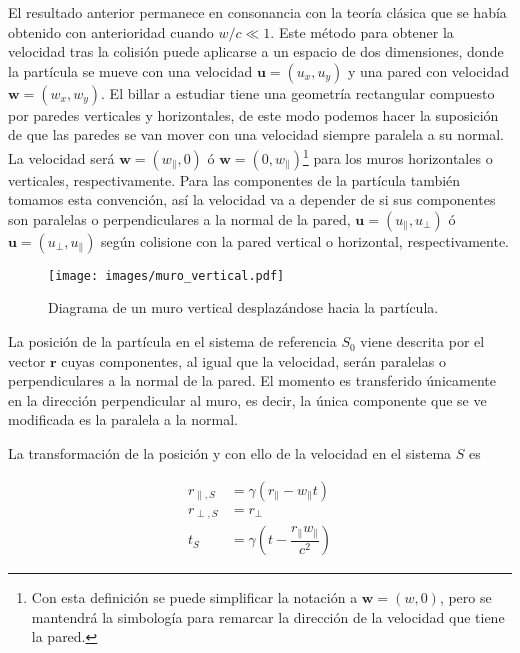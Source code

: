 El resultado anterior permanece en consonancia con la teoría clásica que se había obtenido con anterioridad cuando \( w/c \ll 1 \). Este método para obtener la velocidad tras la colisión puede aplicarse a un espacio de dos dimensiones, donde la partícula se mueve con una velocidad \( \mathbf{u} = (u_x, u_y) \) y una pared con velocidad \( \mathbf{w} = (w_x, w_y) \). El billar a estudiar tiene una geometría rectangular compuesto por paredes verticales y horizontales, de este modo podemos hacer la suposición de que las paredes se van mover con una velocidad siempre paralela a su normal. La velocidad será \( \mathbf{w} = (w_\parallel, 0) \) ó \( \mathbf{w} = (0, w_\parallel) \)\footnote{Con esta definición se puede simplificar la notación a \( \mathbf{w} = (w, 0) \), pero se mantendrá la simbología para remarcar la dirección de la velocidad que tiene la pared.} para los muros horizontales o verticales, respectivamente. Para las componentes de la partícula también tomamos esta convención, así la velocidad va a depender de si sus componentes son paralelas o perpendiculares a la normal de la pared, \( \mathbf{u} = (u_\parallel, u_\perp) \) ó \( \mathbf{u} = (u_\perp, u_\parallel) \) según colisione con la pared vertical o horizontal, respectivamente.

\begin{figure}[H]
    \centering
    \texttt{[image: images/muro\_vertical.pdf]}
    \caption{Diagrama de un muro vertical desplazándose hacia la partícula.}
    \label{fig:muro_vertical}
\end{figure}

La posición de la partícula en el sistema de referencia \( S_0 \) viene descrita por el vector \( \mathbf{r} \) cuyas componentes, al igual que la velocidad, serán paralelas o perpendiculares a la normal de la pared. El momento es transferido únicamente en la dirección perpendicular al muro, es decir, la única componente que se ve modificada es la paralela a la normal. 


\vspace{3mm}

La transformación de la posición y con ello de la velocidad en el sistema \( S \) es

\begin{align}\label{eq:transformacion_2d}
    r_{\parallel,S} &= \gamma\left( r_\parallel - w_\parallel t \right) \nonumber\\
    r_{\perp, S} &= r_\perp  \\
    t_S &= \gamma\left( t - \dfrac{r_\parallel w_\parallel}{c^2} \right) \nonumber
\end{align}

